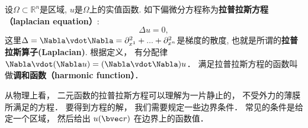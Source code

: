 
\begin{issues}
\issueDraft
\end{issues}


设$\Omega\subset\mathbb{R}^n$是区域, $u$是$\Omega$上的实值函数. 如下偏微分方程称为\textbf{拉普拉斯方程（laplacian equation）}:
\begin{equation}
\Delta u = 0,
\end{equation}
这里$\Delta=\Nabla\vdot\Nabla=\partial_{x^1}^2+...+\partial_{x^n}^2$是梯度的散度, 也就是所谓的\textbf{拉普拉斯算子(Laplacian)}. 根据定义， 有分配律 $\Nabla \vdot (\Nabla u) = (\Nabla \vdot \Nabla) u$． 满足拉普拉斯方程的函数叫做\textbf{调和函数（harmonic function）}．

从物理上看， 二元函数的拉普拉斯方程可以理解为一片静止的， 不受外力的薄膜所满足的方程． 要得到方程的解， 我们需要规定一些边界条件． 常见的条件是给定一个区域， 然后给出 $u(\bvec r)$ 在边界上的函数值．

